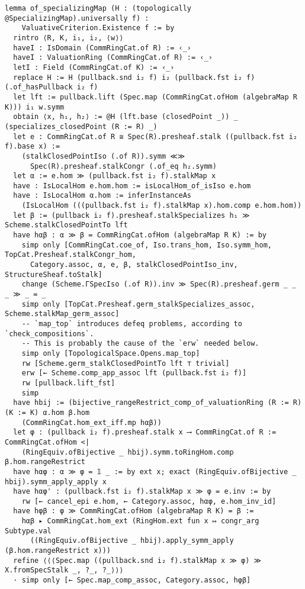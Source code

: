 \documentclass{article}
\begin{document}
\begin{lstlisting}[language=Lean, caption={ValuativeCriterion.lean}]
lemma of_specializingMap (H : (topologically @SpecializingMap).universally f) :
    ValuativeCriterion.Existence f := by
  rintro ⟨R, K, i₁, i₂, ⟨w⟩⟩
  haveI : IsDomain (CommRingCat.of R) := ‹_›
  haveI : ValuationRing (CommRingCat.of R) := ‹_›
  letI : Field (CommRingCat.of K) := ‹_›
  replace H := H (pullback.snd i₂ f) i₂ (pullback.fst i₂ f) (.of_hasPullback i₂ f)
  let lft := pullback.lift (Spec.map (CommRingCat.ofHom (algebraMap R K))) i₁ w.symm
  obtain ⟨x, h₁, h₂⟩ := @H (lft.base (closedPoint _)) _ (specializes_closedPoint (R := R) _)
  let e : CommRingCat.of R ≅ Spec(R).presheaf.stalk ((pullback.fst i₂ f).base x) :=
    (stalkClosedPointIso (.of R)).symm ≪≫
      Spec(R).presheaf.stalkCongr (.of_eq h₂.symm)
  let α := e.hom ≫ (pullback.fst i₂ f).stalkMap x
  have : IsLocalHom e.hom.hom := isLocalHom_of_isIso e.hom
  have : IsLocalHom α.hom := inferInstanceAs
    (IsLocalHom (((pullback.fst i₂ f).stalkMap x).hom.comp e.hom.hom))
  let β := (pullback i₂ f).presheaf.stalkSpecializes h₁ ≫ Scheme.stalkClosedPointTo lft
  have hαβ : α ≫ β = CommRingCat.ofHom (algebraMap R K) := by
    simp only [CommRingCat.coe_of, Iso.trans_hom, Iso.symm_hom, TopCat.Presheaf.stalkCongr_hom,
      Category.assoc, α, e, β, stalkClosedPointIso_inv, StructureSheaf.toStalk]
    change (Scheme.ΓSpecIso (.of R)).inv ≫ Spec(R).presheaf.germ _ _ _ ≫ _ = _
    simp only [TopCat.Presheaf.germ_stalkSpecializes_assoc, Scheme.stalkMap_germ_assoc]
    -- `map_top` introduces defeq problems, according to `check_compositions`.
    -- This is probably the cause of the `erw` needed below.
    simp only [TopologicalSpace.Opens.map_top]
    rw [Scheme.germ_stalkClosedPointTo lft ⊤ trivial]
    erw [← Scheme.comp_app_assoc lft (pullback.fst i₂ f)]
    rw [pullback.lift_fst]
    simp
  have hbij := (bijective_rangeRestrict_comp_of_valuationRing (R := R) (K := K) α.hom β.hom
    (CommRingCat.hom_ext_iff.mp hαβ))
  let φ : (pullback i₂ f).presheaf.stalk x ⟶ CommRingCat.of R := CommRingCat.ofHom <|
    (RingEquiv.ofBijective _ hbij).symm.toRingHom.comp β.hom.rangeRestrict
  have hαφ : α ≫ φ = 𝟙 _ := by ext x; exact (RingEquiv.ofBijective _ hbij).symm_apply_apply x
  have hαφ' : (pullback.fst i₂ f).stalkMap x ≫ φ = e.inv := by
    rw [← cancel_epi e.hom, ← Category.assoc, hαφ, e.hom_inv_id]
  have hφβ : φ ≫ CommRingCat.ofHom (algebraMap R K) = β :=
    hαβ ▸ CommRingCat.hom_ext (RingHom.ext fun x ↦ congr_arg Subtype.val
      ((RingEquiv.ofBijective _ hbij).apply_symm_apply (β.hom.rangeRestrict x)))
  refine ⟨⟨⟨Spec.map ((pullback.snd i₂ f).stalkMap x ≫ φ) ≫ X.fromSpecStalk _, ?_, ?_⟩⟩⟩
  · simp only [← Spec.map_comp_assoc, Category.assoc, hφβ]

\end{lstlisting}
\end{document}
